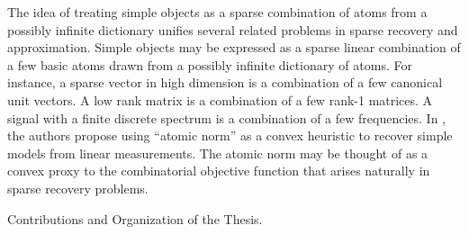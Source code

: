 The idea of treating simple objects as a sparse combination of atoms from a
possibly infinite dictionary unifies several related problems in sparse
recovery and approximation. Simple objects may be expressed as a sparse linear
combination of a few basic atoms drawn from a possibly infinite dictionary of
atoms. For instance, a sparse vector in high dimension is a combination of a
few canonical unit vectors. A low rank matrix is a combination of a few rank-1
matrices. A signal with a finite discrete spectrum is a combination of a few
frequencies.  In \cite{crpw}, the authors propose using ``atomic norm'' as a
convex heuristic to recover simple models from linear measurements. The atomic
norm may be thought of as a convex proxy to the combinatorial objective
function that arises naturally in sparse recovery problems.


Contributions and Organization of the Thesis.